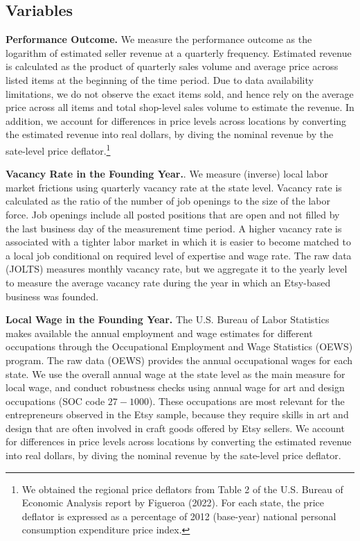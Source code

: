 \documentclass[letterpaper,12pt]{article}
\begin{document}

\subsection{Variables}

\textbf{Performance Outcome.} We measure the performance outcome as the logarithm of estimated seller revenue at a quarterly frequency. Estimated revenue is calculated as the product of quarterly sales volume and average price across listed items at the beginning of the time period. Due to data availability limitations, we do not observe the exact items sold, and hence rely on the average price across all items and total shop-level sales volume to estimate the revenue. In addition, we account for differences in price levels across locations by converting the estimated revenue into real dollars, by diving the nominal revenue by the sate-level price deflator.\footnote{We obtained the regional price deflators from Table 2 of the U.S. Bureau of Economic Analysis report by Figueroa (2022). For each state, the price deflator is expressed as a percentage of 2012 (base-year) national personal consumption expenditure price index.}

\textbf{Vacancy Rate in the Founding Year.}. We measure (inverse) local labor market frictions using quarterly vacancy rate at the state level. Vacancy rate is calculated as the ratio of the number of job openings to the size of the labor force. Job openings include all posted positions that are open and not filled by the last business day of the measurement time period. A higher vacancy rate is associated with a tighter labor market in which it is easier to become matched to a local job conditional on required level of expertise and wage rate. The raw data (JOLTS) measures monthly vacancy rate, but we aggregate it to the yearly level to measure the average vacancy rate during the year in which an Etsy-based business was founded.

\textbf{Local Wage in the Founding Year.} The U.S. Bureau of Labor Statistics makes available the annual employment and wage estimates for different occupations through the Occupational Employment and Wage Statistics (OEWS) program. The raw data (OEWS) provides the annual occupational wages for each state. We use the overall annual wage at the state level as the main measure for local wage, and conduct robustness checks using annual wage for art and design occupations (SOC code $27-1000$). These occupations are most relevant for the entrepreneurs observed in the Etsy sample, because they require skills in art and design that are often involved in craft goods offered by Etsy sellers. We account for differences in price levels across locations by converting the estimated revenue into real dollars, by diving the nominal revenue by the sate-level price deflator.
\end{document}
